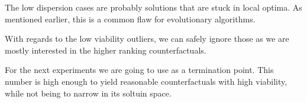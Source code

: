 \documentclass[./../../paper.tex]{subfiles}
\begin{document}
The low dispersion cases are probably solutions that are stuck in local optima. As mentioned earlier, this is a common flaw for evolutionary algorithms.

With regards to the low viability outliers, we can safely ignore those as we are mostly interested in the higher ranking counterfactuals.


For the next experiments we are going to use  as a termination point. This number is high enough to yield reasonable counterfactuals with high viability, while not being to narrow in its soltuin space.
\end{document}
